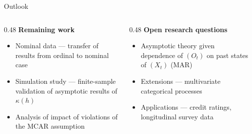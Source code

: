 \documentclass{beamer}
\begin{document}
\begin{frame}{Outlook}
    \begin{columns}[T]
        \begin{column}{0.48\textwidth}
            \textbf{Remaining work}\\[0.5em]
            \begin{itemize}
                \item Nominal data — transfer of results 
                from ordinal to nominal case
                \item Simulation study — finite-sample 
                validation of asymptotic results of $\kappa(h)$
                \item Analysis of impact of 
                violations of the MCAR assumption
            \end{itemize}
        \end{column}
        \hfill
        \begin{column}{0.48\textwidth}
            \textbf{Open research questions}\\[0.5em]
            \begin{itemize}
                \item Asymptotic theory given dependence 
                of $(O_t)$ on past states of $(X_t)$ (MAR)
                \item Extensions —  
                multivariate categorical processes
                \item Applications — credit ratings, 
                longitudinal survey data
            \end{itemize}
        \end{column}
    \end{columns}
\end{frame}
\end{document}

